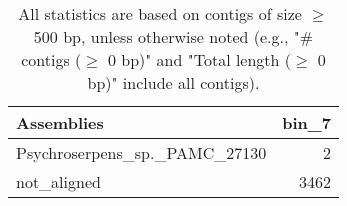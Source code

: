 \documentclass[12pt,a4paper]{article}
\begin{document}
\begin{table}[ht]
\begin{center}
\caption{All statistics are based on contigs of size $\geq$ 500 bp, unless otherwise noted (e.g., "\# contigs ($\geq$ 0 bp)" and "Total length ($\geq$ 0 bp)" include all contigs).}
\begin{tabular}{|l*{1}{|r}|}
\hline
Assemblies & bin\_7 \\ \hline
Psychroserpens\_sp.\_PAMC\_27130 & 2 \\ \hline
not\_aligned & 3462 \\ \hline
\end{tabular}
\end{center}
\end{table}
\end{document}
